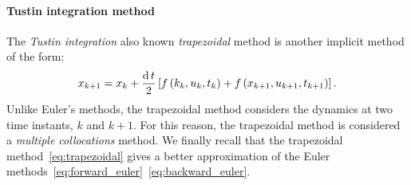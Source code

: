 \paragraph{Tustin integration method}
The \emph{Tustin integration} also known \emph{trapezoidal} method is another implicit method of the form:
\begin{equation}
    \label{eq:trapezoidal}
	x_{k+1} = x_k + \frac{\operatorname{d} t}{2} \left[f\left(k_k, u_k, t_k\right) + f\left(x_{k+1}, u_{k+1}, t_{k+1}\right) \right].
\end{equation}
Unlike Euler's methods, the trapezoidal method considers the dynamics at two time instants, $k$ and $k+1$. For this reason, the trapezoidal method is considered a \emph{multiple collocations} method.
We finally recall that the trapezoidal method~\eqref{eq:trapezoidal} gives a better approximation of the Euler methods~\eqref{eq:forward_euler}~\eqref{eq:backward_euler}.

